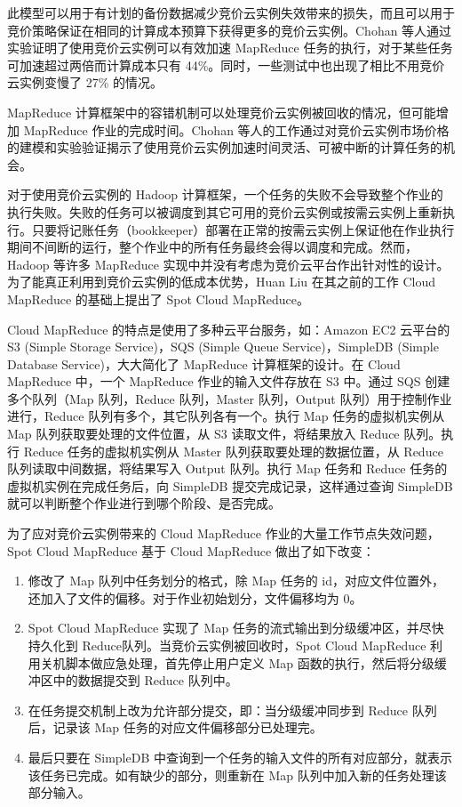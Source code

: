 此模型可以用于有计划的备份数据减少竞价云实例失效带来的损失，而且可以用于竞价策略保证在相同的计算成本预算下获得更多的竞价云实例。Chohan 等人通过实验证明了使用竞价云实例可以有效加速 MapReduce 任务的执行，对于某些任务可加速超过两倍而计算成本只有 44\%。同时，一些测试中也出现了相比不用竞价云实例变慢了 27\% 的情况。

MapReduce 计算框架中的容错机制可以处理竞价云实例被回收的情况，但可能增加 MapReduce 作业的完成时间。Chohan 等人的工作通过对竞价云实例市场价格的建模和实验验证揭示了使用竞价云实例加速时间灵活、可被中断的计算任务的机会。

对于使用竞价云实例的 Hadoop \cite{hadoop:2014} 计算框架，一个任务的失败不会导致整个作业的执行失败。失败的任务可以被调度到其它可用的竞价云实例或按需云实例上重新执行。只要将记账任务（bookkeeper）部署在正常的按需云实例上保证他在作业执行期间不间断的运行，整个作业中的所有任务最终会得以调度和完成。然而，Hadoop 等许多 MapReduce 实现中并没有考虑为竞价云平台作出针对性的设计。为了能真正利用到竞价云实例的低成本优势，Huan Liu \cite{Liu:2011:CMC:2170444.2170450} 在其之前的工作 Cloud MapReduce \cite{Liu:2011:CMM:2007336.2007355} 的基础上提出了 Spot Cloud MapReduce。

Cloud MapReduce 的特点是使用了多种云平台服务，如：Amazon EC2 云平台的 S3 (Simple Storage Service)，SQS (Simple Queue Service)，SimpleDB (Simple Database Service)，大大简化了 MapReduce 计算框架的设计。在 Cloud MapReduce 中，一个 MapReduce 作业的输入文件存放在 S3 中。通过 SQS 创建多个队列（Map 队列，Reduce 队列，Master 队列，Output 队列）用于控制作业进行，Reduce 队列有多个，其它队列各有一个。执行 Map 任务的虚拟机实例从 Map 队列获取要处理的文件位置，从 S3 读取文件，将结果放入 Reduce 队列。执行 Reduce 任务的虚拟机实例从 Master 队列获取要处理的数据位置，从 Reduce 队列读取中间数据，将结果写入 Output 队列。执行 Map 任务和 Reduce 任务的虚拟机实例在完成任务后，向 SimpleDB 提交完成记录，这样通过查询 SimpleDB 就可以判断整个作业进行到哪个阶段、是否完成。

为了应对竞价云实例带来的 Cloud MapReduce 作业的大量工作节点失效问题，Spot Cloud MapReduce 基于 Cloud MapReduce 做出了如下改变：
\begin{enumerate}
\item 修改了 Map 队列中任务划分的格式，除 Map 任务的 id，对应文件位置外，还加入了文件的偏移。对于作业初始划分，文件偏移均为 0。
\item Spot Cloud MapReduce 实现了 Map 任务的流式输出到分级缓冲区，并尽快持久化到 Reduce队列。当竞价云实例被回收时，Spot Cloud MapReduce 利用关机脚本做应急处理，首先停止用户定义 Map 函数的执行，然后将分级缓冲区中的数据提交到 Reduce 队列中。
\item 在任务提交机制上改为允许部分提交，即：当分级缓冲同步到 Reduce 队列后，记录该 Map 任务的对应文件偏移部分已处理完。
\item 最后只要在 SimpleDB 中查询到一个任务的输入文件的所有对应部分，就表示该任务已完成。如有缺少的部分，则重新在 Map 队列中加入新的任务处理该部分输入。
\end{enumerate}

